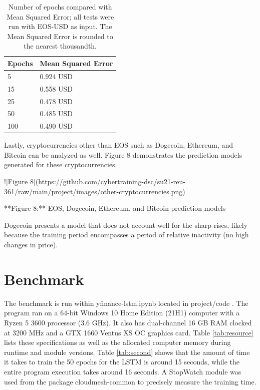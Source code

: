 \documentclass[acmtog,authorversion]{acmart}
\begin{document}
\begin{table}[htb]
\caption{Number of epochs compared with Mean Squared Error; all tests were run with EOS-USD as input. The Mean Squared Error is rounded to the nearest thousandth.}
\label{tab:epochvsmse}
\begin{tabular}{ll}
Epochs &   Mean Squared Error   \\
\hline
 5      & 0.924 USD              \\
 15     & 0.558 USD              \\
 25     & 0.478 USD              \\
 50     & 0.485 USD              \\
 100    & 0.490 USD              \\
\hline
\end{tabular}
\end{table}

Lastly, cryptocurrencies other than EOS such as Dogecoin, Ethereum, and Bitcoin can be analyzed as well. Figure 8 demonstrates the prediction models generated for these cryptocurrencies.

![Figure 8](https://github.com/cybertraining-dsc/su21-reu-361/raw/main/project/images/other-cryptocurrencies.png)

**Figure 8:** EOS, Dogecoin, Ethereum, and Bitcoin prediction models

Dogecoin presents a model that does not account well for the sharp rises, likely because the training period encompasses a period of relative inactivity (no high changes in price). 

\section{Benchmark}

The benchmark is run within yfinance-lstm.ipynb located in project/code \cite{c-13}. The program ran on a 64-bit Windows 10 Home Edition (21H1) computer with a Ryzen 5 3600 processor (3.6 GHz). It also has dual-channel 16 GB RAM clocked at 3200 MHz and a GTX 1660 Ventus XS OC graphics card. Table \ref{tab:resource} lists these specifications as well as the allocated computer memory during runtime and module versions. Table \ref{tab:second} shows that the amount of time it takes to train the 50 epochs for the LSTM is around 15 seconds, while the entire program execution takes around 16 seconds. A StopWatch module was used from the package cloudmesh-common \cite{c-10} to precisely measure the training time.
 
\end{document}
